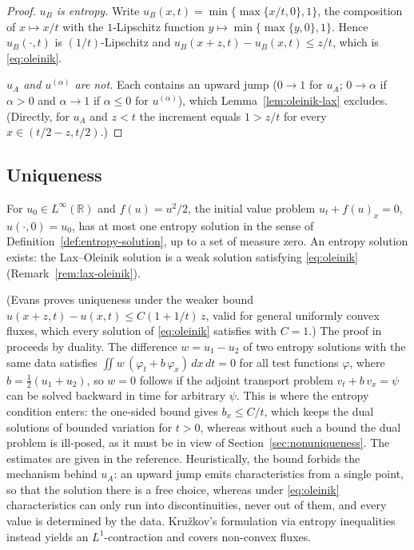 \begin{proof}
\emph{$u_B$ is entropy.} Write $u_B(x,t)=\min\{\max\{x/t,0\},1\}$, the
composition of $x\mapsto x/t$ with the $1$-Lipschitz function
$y\mapsto\min\{\max\{y,0\},1\}$. Hence $u_B(\cdot,t)$ is $(1/t)$-Lipschitz
and $u_B(x+z,t)-u_B(x,t)\le z/t$, which is \eqref{eq:oleinik}.

\emph{$u_A$ and $u^{(\alpha)}$ are not.} Each contains an upward jump ($0\to1$ for
$u_A$; $0\to\alpha$ if $\alpha>0$ and $\alpha\to1$ if $\alpha\le0$ for
$u^{(\alpha)}$), which Lemma~\ref{lem:oleinik-lax} excludes. (Directly, for $u_A$
and $z<t$ the increment equals $1>z/t$ for every $x\in(t/2-z,t/2)$.)
\end{proof}

\subsection{Uniqueness}
\label{subsec:entropy-uniqueness}

\begin{theorem}
\label{thm:oleinik-uniqueness}
For $u_0 \in L^\infty(\mathbb{R})$ and $f(u)=u^2/2$, the initial value
problem $u_t+f(u)_x=0$, $u(\cdot,0)=u_0$, has at most one entropy solution in
the sense of Definition~\ref{def:entropy-solution}, up to a set of measure
zero. An entropy solution exists: the Lax--Oleinik solution
\cite[\S3.4.2]{evans2010} is a weak solution satisfying
\eqref{eq:oleinik} (Remark~\ref{rem:lax-oleinik}).
\end{theorem}

(Evans proves uniqueness under the weaker bound
$u(x+z,t)-u(x,t)\le C(1+1/t)\,z$, valid for general uniformly convex fluxes,
which every solution of \eqref{eq:oleinik} satisfies with $C=1$.) The proof in \cite[\S3.4.3]{evans2010} proceeds by duality. The difference
$w=u_1-u_2$ of two entropy solutions with the same data satisfies
$\iint w\,(\varphi_t+b\,\varphi_x)\,dx\,dt=0$ for all test functions $\varphi$,
where $b=\tfrac12(u_1+u_2)$, so $w=0$ follows if the adjoint transport problem
$v_t+b\,v_x=\psi$ can be solved backward in time for arbitrary $\psi$. This is
where the entropy condition enters: the one-sided bound gives $b_x\le C/t$,
which keeps the dual solutions of bounded variation for $t>0$, whereas without
such a bound the dual problem is ill-posed, as it must be in view of
Section~\ref{sec:nonuniqueness}. The estimates are given in the reference. Heuristically, the bound forbids the
mechanism behind $u_A$: an upward jump emits characteristics from a single point, so
that the solution there is a free choice, whereas under \eqref{eq:oleinik}
characteristics can only run into discontinuities, never out of them, and every
value is determined by the data.
Kru\v{z}kov's formulation via entropy inequalities \cite{kruzhkov1970} instead
yields an $L^1$-contraction and covers non-convex fluxes.

